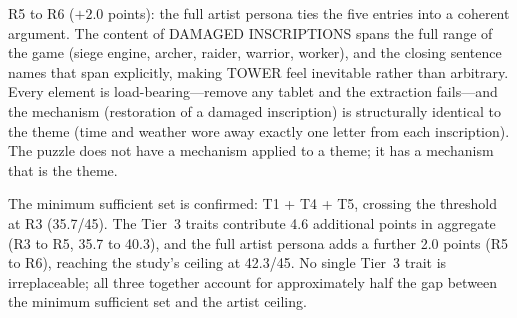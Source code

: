 R5 to R6 ($+2.0$ points): the full artist persona ties the five entries into a coherent argument. The content of DAMAGED INSCRIPTIONS spans the full range of the game (siege engine, archer, raider, warrior, worker), and the closing sentence names that span explicitly, making TOWER feel inevitable rather than arbitrary. Every element is load-bearing---remove any tablet and the extraction fails---and the mechanism (restoration of a damaged inscription) is structurally identical to the theme (time and weather wore away exactly one letter from each inscription). The puzzle does not have a mechanism applied to a theme; it has a mechanism that is the theme.

The minimum sufficient set is confirmed: T1 + T4 + T5, crossing the threshold at R3 (35.7/45). The Tier~3 traits contribute 4.6 additional points in aggregate (R3 to R5, 35.7 to 40.3), and the full artist persona adds a further 2.0 points (R5 to R6), reaching the study's ceiling at 42.3/45. No single Tier~3 trait is irreplaceable; all three together account for approximately half the gap between the minimum sufficient set and the artist ceiling.
